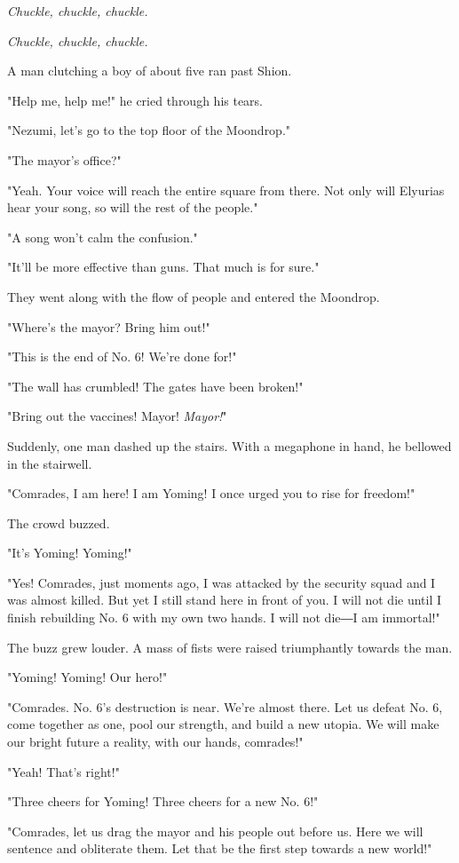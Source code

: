 \emph{Chuckle, chuckle, chuckle.}

\emph{Chuckle, chuckle, chuckle.}

A man clutching a boy of about five ran past Shion.

"Help me, help me!" he cried through his tears.

"Nezumi, let's go to the top floor of the Moondrop."

"The mayor's office?"

"Yeah. Your voice will reach the entire square from there. Not only will
Elyurias hear your song, so will the rest of the people."

"A song won't calm the confusion."

"It'll be more effective than guns. That much is for sure."

They went along with the flow of people and entered the Moondrop.

"Where's the mayor? Bring him out!"

"This is the end of No. 6! We're done for!"

"The wall has crumbled! The gates have been broken!"

"Bring out the vaccines! Mayor! \emph{Mayor!}"

Suddenly, one man dashed up the stairs. With a megaphone in hand, he
bellowed in the stairwell.

"Comrades, I am here! I am Yoming! I once urged you to rise for
freedom!"

The crowd buzzed.

"It's Yoming! Yoming!"

"Yes! Comrades, just moments ago, I was attacked by the security squad
and I was almost killed. But yet I still stand here in front of you. I
will not die until I finish rebuilding No. 6 with my own two hands. I
will not die―I am immortal!"

The buzz grew louder. A mass of fists were raised triumphantly towards
the man.

"Yoming! Yoming! Our hero!"

"Comrades. No. 6's destruction is near. We're almost there. Let us
defeat No. 6, come together as one, pool our strength, and build a new
utopia. We will make our bright future a reality, with our hands,
comrades!"

"Yeah! That's right!"

"Three cheers for Yoming! Three cheers for a new No. 6!"

"Comrades, let us drag the mayor and his people out before us. Here we
will sentence and obliterate them. Let that be the first step towards a
new world!"

